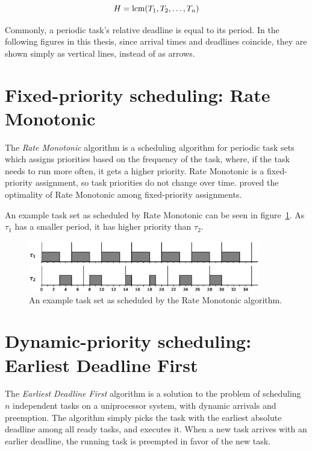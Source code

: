 \begin{equation}
    H = \operatorname{lcm}(T_1, T_2, \ldots, T_n)
\end{equation}

Commonly, a periodic task's relative deadline is equal to its period. In the following figures in this thesis, since arrival times and deadlines coincide, they are shown simply as vertical lines, instead of as arrows.

\section{Fixed-priority scheduling: Rate Monotonic}
The \emph{Rate Monotonic} algorithm is a scheduling algorithm for periodic task sets which assigns priorities based on the frequency of the task, where, if the task needs to run more often, it gets a higher priority. Rate Monotonic is a fixed-priority assignment, so task priorities do not change over time. \textcite{Liu1973} proved the optimality of Rate Monotonic among fixed-priority assignments.

An example task set as scheduled by Rate Monotonic can be seen in figure~\ref{fig:rmexample}. As $\tau_1$ has a smaller period, it has higher priority than $\tau_2$.

\begin{figure}[htpb]
    \centering
    \includegraphics[width=0.9\textwidth]{figures/rmexample.eps}
    \caption{An example task set as scheduled by the Rate Monotonic algorithm.}
    \label{fig:rmexample}
\end{figure}

\section{Dynamic-priority scheduling: Earliest Deadline First}
The \emph{Earliest Deadline First} algorithm is a solution to the problem of scheduling $n$ independent tasks on a uniprocessor system, with dynamic arrivals and preemption. The algorithm simply picks the task with the earliest absolute deadline among all ready tasks, and executes it. When a new task arrives with an earlier deadline, the running task is preempted in favor of the new task.

